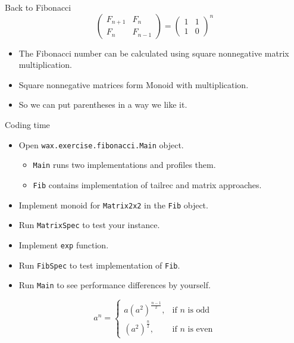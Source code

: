 \documentclass[presentation,aspectratio=169,smaller]{beamer}
\begin{document}
\begin{frame}[label={sec:org34e8b06}]{Back to Fibonacci}
\begin{equation*}
  \begin{pmatrix}
    F_{n+1} & F_n \\
    F_n & F_{n-1}
  \end{pmatrix} =
  \begin{pmatrix}
    1 & 1 \\
    1 & 0
  \end{pmatrix} ^ n
\end{equation*}

\pause

\begin{itemize}
\item The Fibonacci number can be calculated using square nonnegative matrix
multiplication.
\item Square nonnegative matrices form Monoid with multiplication.
\item So we can put parentheses in a way we like it.
\end{itemize}
\end{frame}

\begin{frame}[label={sec:orgd4c1adb},fragile]{Coding time}
 \begin{itemize}
\item Open \texttt{wax.exercise.fibonacci.Main} object.
\begin{itemize}
\item \texttt{Main} runs two implementations and profiles them.
\item \texttt{Fib} contains implementation of tailrec and matrix approaches.
\end{itemize}
\item Implement monoid for \texttt{Matrix2x2} in the \texttt{Fib} object.
\item Run \texttt{MatrixSpec} to test your instance.
\item Implement \texttt{exp} function.
\item Run \texttt{FibSpec} to test implementation of \texttt{Fib}.
\item Run \texttt{Main} to see performance differences by yourself.
\end{itemize}

\pause

\begin{equation*}
  a^n = \begin{cases} a(a^2)^{\frac{n-1}{2}}, & \mbox{if } n\mbox{ is odd} \\ (a^2)^{\frac{n}{2}}, & \mbox{if } n\mbox{ is even} \end{cases}
\end{equation*}
\end{frame}
\end{document}
